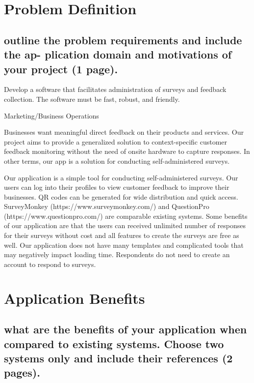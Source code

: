 \documentclass[letterpaper, 10 pt, conference]{ieeeconf}
\begin{document}
\thispagestyle{empty}
\pagestyle{empty}


\begin{abstract}
\end{abstract}


\section{Problem Definition}
\subsection{outline the problem requirements and include the ap- plication domain and motivations of your project (1 page).}
Develop a software that facilitates administration of surveys and feedback collection. The software must be fast, robust, and friendly.

Marketing/Business Operations 

Businesses want meaningful direct feedback on their products and services. Our project aims to provide a generalized solution to context-specific customer feedback monitoring without the need of onsite hardware to capture responses. In other terms, our app is a solution for conducting self-administered surveys.

Our application is a simple tool for conducting self-administered surveys. Our users can log into their profiles to view customer feedback to improve their businesses. QR codes can be generated for wide distribution and quick access. SurveyMonkey (https://www.surveymonkey.com/) and QuestionPro (https://www.questionpro.com/) are comparable existing systems. Some benefits of our application are that the users can received unlimited number of responses for their surveys without cost and all features to create the surveys are free as well. Our application does not have many templates and complicated tools that may negatively impact loading time. Respondents do not need to create an account to respond to surveys. 


    

\section{Application Benefits}
\subsection{what are the benefits of your application when compared to existing systems. Choose two systems only and include their references (2 pages).}
\end{document}
